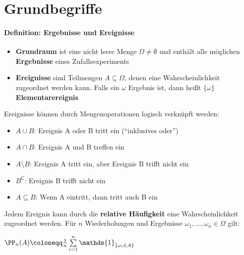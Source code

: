 \section{Grundbegriffe}
\paragraph{Definition: Ergebnisse und Ereignisse}
\begin{itemize}
	\item \textbf{Grundraum} ist eine nicht leere Menge $\Omega\neq\emptyset$ und enthält alle möglichen \textbf{Ergebnisse} eines Zufallsexperiments
	\item \textbf{Ereignisse} sind Teilmengen $A\subseteq\Omega$, denen eine Wahrscheinlichkeit zugeordnet werden kann. 
	Falls ein $\omega$ Ergebnis ist, dann heißt $\{\omega\}$ \textbf{Elementarereignis}
\end{itemize}
Ereignisse können durch Mengenoperationen logisch verknüpft werden:
\begin{itemize}
	\item $A\cup B$: Ereignis A oder B tritt ein (\enquote{inklusives oder})
	\item $A\cap B$: Ereignis A und B treffen ein
	\item $A\setminus B$: Ereignis A tritt ein, aber Ereignis B trifft nicht ein
	\item $B^{\mathsf{C}}$: Ereignis B trifft nicht ein
	\item $A\subseteq B$: Wenn A eintritt, dann tritt auch B ein
\end{itemize}
Jedem Ereignis kann durch die \textbf{relative Häufigkeit} eine Wahrscheinlichkeit zugeordnet werden. 
Für $n$ Wiederholungen und Ergebnisse $\omega_1,\ldots,\omega_n\in\Omega$ gilt:
\begin{tightcenter}
	$\PP_n(A)\coloneqq\frac{1}{n}\sum\limits_{i=1}^{n} \mathds{1}_{\{\omega_i \in A\}}$
\end{tightcenter}

